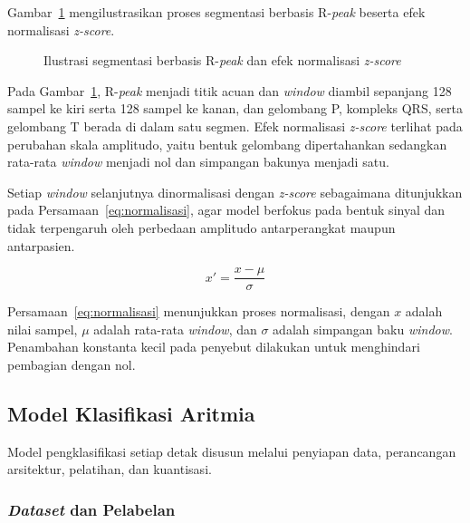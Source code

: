 Gambar~\ref{fig:segmentasi} mengilustrasikan proses segmentasi berbasis R-\textit{peak} beserta
efek normalisasi \textit{z-score}.

\begin{figure}[H]
  \centering
  \caption{Ilustrasi segmentasi berbasis R-\textit{peak} dan efek normalisasi \textit{z-score}}
  \label{fig:segmentasi}
\end{figure}

Pada Gambar~\ref{fig:segmentasi}, R-\textit{peak} menjadi titik acuan dan \textit{window} diambil sepanjang 128 sampel ke kiri serta 128 sampel ke kanan, dan gelombang P, kompleks QRS, serta gelombang T berada di dalam satu segmen. Efek normalisasi \textit{z-score} terlihat pada perubahan skala amplitudo, yaitu bentuk gelombang dipertahankan sedangkan rata-rata \textit{window} menjadi nol dan simpangan bakunya menjadi satu.

Setiap \textit{window} selanjutnya dinormalisasi dengan \textit{z-score} sebagaimana ditunjukkan pada Persamaan~\ref{eq:normalisasi}, agar model berfokus pada bentuk sinyal dan tidak terpengaruh oleh perbedaan amplitudo antarperangkat maupun antarpasien.

\begin{equation}
\label{eq:normalisasi}
x' = \frac{x-\mu}{\sigma}
\end{equation}

Persamaan~\ref{eq:normalisasi} menunjukkan proses normalisasi, dengan $x$ adalah nilai sampel, $\mu$ adalah rata-rata \textit{window}, dan $\sigma$ adalah simpangan baku \textit{window}. Penambahan konstanta kecil pada penyebut dilakukan untuk menghindari pembagian dengan nol.

\subsection{Model Klasifikasi Aritmia}

Model pengklasifikasi setiap detak disusun melalui penyiapan data, perancangan arsitektur, pelatihan, dan kuantisasi.

\subsubsection{\textit{Dataset} dan Pelabelan}

